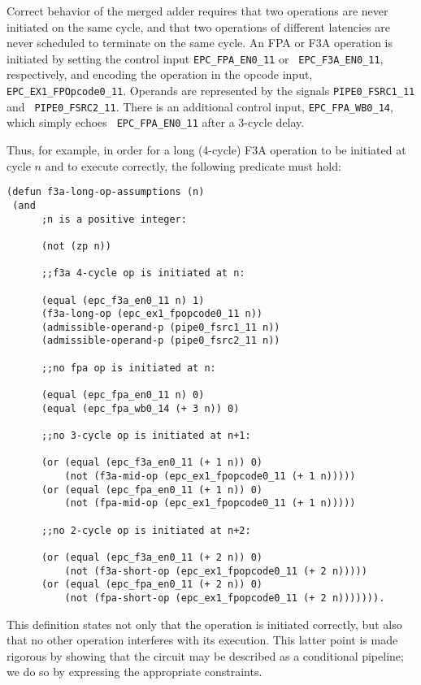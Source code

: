 \documentclass{article}
\begin{document}
Correct behavior of the merged adder requires that two operations are
never initiated on the same cycle, and that two operations of
different latencies are never scheduled to terminate on the same
cycle.  An FPA or F3A operation is initiated by setting the control
input {\tt EPC\verb!_!FPA\verb!_!EN0\verb!_!11} or {\tt
EPC\verb!_!F3A\verb!_!EN0\verb!_!11}, respectively, and encoding the
operation in the opcode input, {\tt
EPC\verb!_!EX1\verb!_!FPOpcode0\verb!_!11}.  Operands are represented
by the signals {\tt PIPE0\verb!_!FSRC1\verb!_!11} and {\tt
PIPE0\verb!_!FSRC2\verb!_!11}.  There is an additional control input,
{\tt EPC\verb!_!FPA\verb!_!WB0\verb!_!14}, which simply echoes {\tt
EPC\verb!_!FPA\verb!_!EN0\verb!_!11} after a 3-cycle delay.

Thus, for example, in order for a long (4-cycle) F3A operation to be
initiated at cycle $n$ and to execute correctly, the following
predicate must hold:

\begin{verbatim}
(defun f3a-long-op-assumptions (n)
 (and
      ;n is a positive integer:

      (not (zp n))

      ;;f3a 4-cycle op is initiated at n:

      (equal (epc_f3a_en0_11 n) 1)
      (f3a-long-op (epc_ex1_fpopcode0_11 n))
      (admissible-operand-p (pipe0_fsrc1_11 n))
      (admissible-operand-p (pipe0_fsrc2_11 n))
      
      ;;no fpa op is initiated at n:  
     
      (equal (epc_fpa_en0_11 n) 0)
      (equal (epc_fpa_wb0_14 (+ 3 n)) 0)
       
      ;;no 3-cycle op is initiated at n+1: 
      
      (or (equal (epc_f3a_en0_11 (+ 1 n)) 0)
          (not (f3a-mid-op (epc_ex1_fpopcode0_11 (+ 1 n)))))       
      (or (equal (epc_fpa_en0_11 (+ 1 n)) 0)
          (not (fpa-mid-op (epc_ex1_fpopcode0_11 (+ 1 n)))))
       
      ;;no 2-cycle op is initiated at n+2:
       
      (or (equal (epc_f3a_en0_11 (+ 2 n)) 0)
          (not (f3a-short-op (epc_ex1_fpopcode0_11 (+ 2 n)))))         
      (or (equal (epc_fpa_en0_11 (+ 2 n)) 0)
          (not (fpa-short-op (epc_ex1_fpopcode0_11 (+ 2 n))))))).
\end{verbatim}
This definition states not only that the operation is initiated
correctly, but also that no other operation interferes with its
execution.  This latter point is made rigorous by showing that the
circuit may be described as a conditional pipeline; we do so by
expressing the appropriate constraints.
\end{document}
